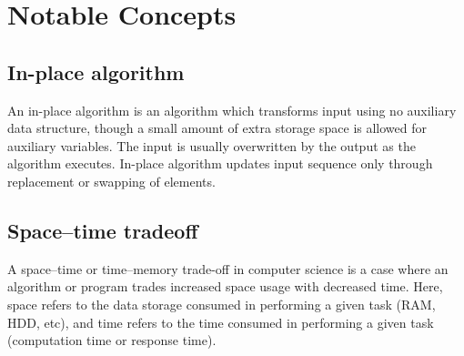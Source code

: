 \documentclass{article}
\begin{document}
    
    


\section{Notable Concepts}
    \subsection{In-place algorithm}
        An in-place algorithm is an algorithm which transforms input using no auxiliary data structure, though a small amount of extra storage space is allowed for auxiliary variables. The input is usually overwritten by the output as the algorithm executes. In-place algorithm updates input sequence only through replacement or swapping of elements.
        
    \subsection{Space–time tradeoff}
        A space–time or time–memory trade-off in computer science is a case where an algorithm or program trades increased space usage with decreased time. Here, space refers to the data storage consumed in performing a given task (RAM, HDD, etc), and time refers to the time consumed in performing a given task (computation time or response time).
        
\end{document}
